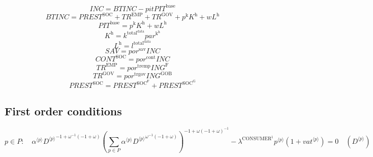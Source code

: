 \begin{equation}
{I\!N\!C} = {B\!T\!I\!N\!C} - {{p\!i\!t}} {{P\!I\!T}^{\mathrm{base}}}
\end{equation}
\begin{equation}
{B\!T\!I\!N\!C} = {P\!R\!E\!S\!T}^{\mathrm{SOC}} + {T\!R}^{\mathrm{EMP}} + {T\!R}^{\mathrm{GOV}} + {p^{\mathrm{k}}} {K^{\mathrm{h}}} + {w} {L^{\mathrm{h}}}
\end{equation}
\begin{equation}
{P\!I\!T}^{\mathrm{base}} = {p^{\mathrm{k}}} {K^{\mathrm{h}}} + {w} {L^{\mathrm{h}}}
\end{equation}
\begin{equation}
K^{\mathrm{h}} = {k^{\mathrm{total}^{\mathrm{data}}}} {{p\!a\!r}^{\mathrm{k}^{\mathrm{h}}}}
\end{equation}
\begin{equation}
L^{\mathrm{h}} = l^{\mathrm{total}^{\mathrm{data}}}
\end{equation}
\begin{equation}
{S\!A\!V} = {{p\!o\!r}^{\mathrm{sav}}} {{I\!N\!C}}
\end{equation}
\begin{equation}
{C\!O\!N\!T}^{\mathrm{SOC}} = {{p\!o\!r}^{\mathrm{cont}}} {{I\!N\!C}}
\end{equation}
\begin{equation}
{T\!R}^{\mathrm{EMP}} = {{p\!o\!r}^{\mathrm{tremp}}} {{I\!N\!G}^{\mathrm{F}}}
\end{equation}
\begin{equation}
{T\!R}^{\mathrm{GOV}} = {{p\!o\!r}^{\mathrm{trgov}}} {{I\!N\!G}^{\mathrm{GOB}}}
\end{equation}
\begin{equation}
{P\!R\!E\!S\!T}^{\mathrm{SOC}} = {P\!R\!E\!S\!T}^{\mathrm{SOC}^{\mathrm{F}}} + {P\!R\!E\!S\!T}^{\mathrm{SOC}^{\mathrm{G}}}
\end{equation}


\subsection{First order conditions}

\begin{equation}
p\in P\colon\quad {{\alpha}^{\langle p\rangle}} {{{D}^{\langle p\rangle}}^{-1 + {\omega}^{-1} \left(-1 + \omega\right)}} {\left(\sum_{p\in P} {{\alpha}^{\langle p\rangle}} {{{D}^{\langle p\rangle}}^{{\omega}^{-1} \left(-1 + \omega\right)}}\right)^{-1 + {\omega} \left(-1 + \omega\right)^{-1}}} - {\lambda^{\mathrm{CONSUMER}^{\mathrm{1}}}} {{p}^{\langle p\rangle}} \left(1 + {{v\!a\!t}}^{\langle p\rangle}\right) = 0
 \quad \left({D}^{\langle p\rangle}\right)
\end{equation}




